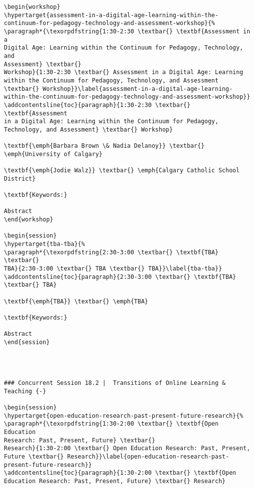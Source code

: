 \documentclass[
]{book}
\begin{document}
\begin{verbatim}
\begin{workshop}
\hypertarget{assessment-in-a-digital-age-learning-within-the-continuum-for-pedagogy-technology-and-assessment-workshop}{%
\paragraph*{\texorpdfstring{1:30-2:30 \textbar{} \textbf{Assessment in a
Digital Age: Learning within the Continuum for Pedagogy, Technology, and
Assessment} \textbar{}
Workshop}{1:30-2:30 \textbar{} Assessment in a Digital Age: Learning within the Continuum for Pedagogy, Technology, and Assessment \textbar{} Workshop}}\label{assessment-in-a-digital-age-learning-within-the-continuum-for-pedagogy-technology-and-assessment-workshop}}
\addcontentsline{toc}{paragraph}{1:30-2:30 \textbar{} \textbf{Assessment
in a Digital Age: Learning within the Continuum for Pedagogy,
Technology, and Assessment} \textbar{} Workshop}

\textbf{\emph{Barbara Brown \& Nadia Delanoy}} \textbar{}
\emph{University of Calgary}

\textbf{\emph{Jodie Walz}} \textbar{} \emph{Calgary Catholic School
District}

\textbf{Keywords:}

Abstract
\end{workshop}

\begin{session}
\hypertarget{tba-tba}{%
\paragraph*{\texorpdfstring{2:30-3:00 \textbar{} \textbf{TBA} \textbar{}
TBA}{2:30-3:00 \textbar{} TBA \textbar{} TBA}}\label{tba-tba}}
\addcontentsline{toc}{paragraph}{2:30-3:00 \textbar{} \textbf{TBA}
\textbar{} TBA}

\textbf{\emph{TBA}} \textbar{} \emph{TBA}

\textbf{Keywords:}

Abstract
\end{session}




### Concurrent Session 18.2 |  Transitions of Online Learning & Teaching {-}

\begin{session}
\hypertarget{open-education-research-past-present-future-research}{%
\paragraph*{\texorpdfstring{1:30-2:00 \textbar{} \textbf{Open Education
Research: Past, Present, Future} \textbar{}
Research}{1:30-2:00 \textbar{} Open Education Research: Past, Present, Future \textbar{} Research}}\label{open-education-research-past-present-future-research}}
\addcontentsline{toc}{paragraph}{1:30-2:00 \textbar{} \textbf{Open
Education Research: Past, Present, Future} \textbar{} Research}


\end{verbatim}
\end{document}
